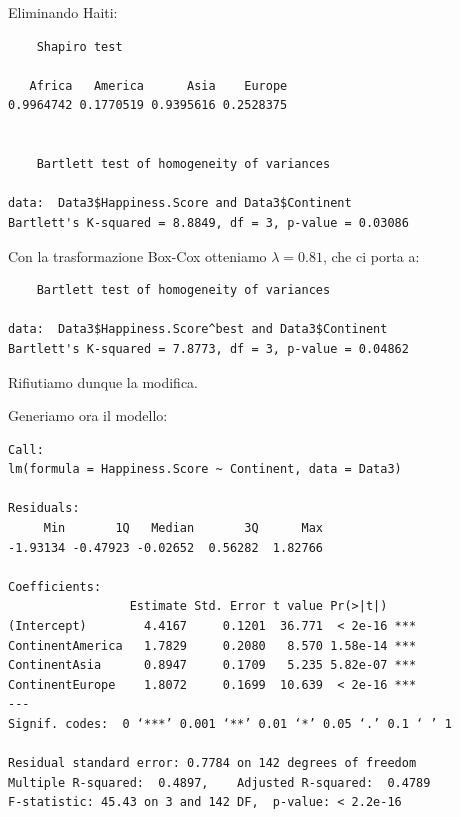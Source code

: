 \documentclass{beamer}
\begin{document}
\begin{frame}[fragile]
    Eliminando Haiti:
    \tiny
    \begin{verbatim}
    Shapiro test

   Africa   America      Asia    Europe 
0.9964742 0.1770519 0.9395616 0.2528375 


    Bartlett test of homogeneity of variances

data:  Data3$Happiness.Score and Data3$Continent
Bartlett's K-squared = 8.8849, df = 3, p-value = 0.03086
    \end{verbatim}
\end{frame}

\begin{frame}[fragile]
    Con la trasformazione Box-Cox otteniamo $\lambda=0.81$, che ci porta a:
    \tiny
    \begin{verbatim}
    Bartlett test of homogeneity of variances

data:  Data3$Happiness.Score^best and Data3$Continent
Bartlett's K-squared = 7.8773, df = 3, p-value = 0.04862 
    \end{verbatim}

    \normalsize Rifiutiamo dunque la modifica.
\end{frame}

\begin{frame}[fragile]
    Generiamo ora il modello:
    \tiny
    \begin{verbatim}
Call:
lm(formula = Happiness.Score ~ Continent, data = Data3)

Residuals:
     Min       1Q   Median       3Q      Max 
-1.93134 -0.47923 -0.02652  0.56282  1.82766 

Coefficients:
                 Estimate Std. Error t value Pr(>|t|)    
(Intercept)        4.4167     0.1201  36.771  < 2e-16 ***
ContinentAmerica   1.7829     0.2080   8.570 1.58e-14 ***
ContinentAsia      0.8947     0.1709   5.235 5.82e-07 ***
ContinentEurope    1.8072     0.1699  10.639  < 2e-16 ***
---
Signif. codes:  0 ‘***’ 0.001 ‘**’ 0.01 ‘*’ 0.05 ‘.’ 0.1 ‘ ’ 1

Residual standard error: 0.7784 on 142 degrees of freedom
Multiple R-squared:  0.4897,    Adjusted R-squared:  0.4789 
F-statistic: 45.43 on 3 and 142 DF,  p-value: < 2.2e-16
    \end{verbatim}
\end{frame}
\end{document}
